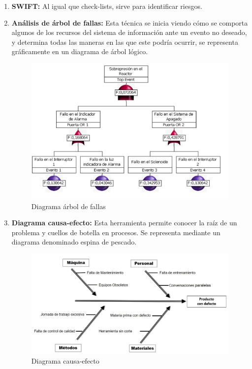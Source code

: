 \begin{enumerate}
\item {\bfseries SWIFT:}
Al igual que check-lists, sirve para identificar riesgos.
\item {\bfseries Análisis de árbol de fallas:}
Esta técnica se inicia viendo cómo se comporta algunos de los recursos del sistema de información ante un evento no deseado, y determina todas las maneras en las que este podría ocurrir, se representa gráficamente en un diagrama de árbol lógico.
\begin{figure}[tphb]
  		   \centering
     		   \includegraphics[width=5in]{diagrama-arbol-fallas.png}
  		   \caption{Diagrama árbol de fallas \cite{daf}}
  		   \label{img:diagrama_arbol_de_fallas}
\end{figure}
\item {\bfseries Diagrama causa-efecto:}
Esta herramienta permite conocer la raíz de un problema y cuellos de botella en procesos. Se representa mediante un diagrama denominado espina de pescado.
\begin{figure}[tphb]
  		   \centering
     		   \includegraphics[width=6in]{diagrama-causa-efecto.jpg}
  		   \caption{Diagrama causa-efecto \cite{diagrama-pescado}}
  		   \label{img:diagrama_causa_efecto}
\end{figure}


\end{enumerate}
